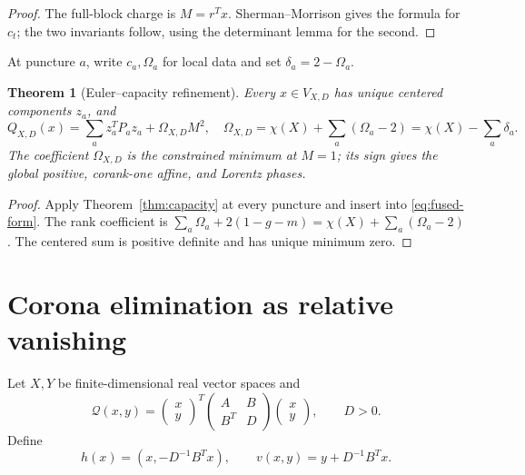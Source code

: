 \documentclass[11pt,a4paper]{amsart}
\theoremstyle{plain}
\newtheorem{theorem}{Theorem}[section]
\theoremstyle{definition}
\begin{document}
\begin{proof}
The full-block charge is $M=r^Tx$.  Sherman--Morrison gives the formula for $c_t$; the two
invariants follow, using the determinant lemma for the second.
\end{proof}

At puncture $a$, write $c_a,\Omega_a$ for local data and set $\delta_a=2-\Omega_a$.

\begin{theorem}[Euler--capacity refinement]\label{thm:euler-capacity}
Every $x\in V_{X,D}$ has unique centered components $z_a$, and
\begin{equation}\label{eq:euler-capacity}
 \boxed{Q_{X,D}(x)=\sum_a z_a^TP_az_a+\Omega_{X,D}M^2,
 \quad \Omega_{X,D}=\chi(X)+\sum_a(\Omega_a-2)
                    =\chi(X)-\sum_a\delta_a.}
\end{equation}
The coefficient $\Omega_{X,D}$ is the constrained minimum at $M=1$; its sign gives the global
positive, corank-one affine, and Lorentz phases.
\end{theorem}

\begin{proof}
Apply Theorem~\ref{thm:capacity} at every puncture and insert into \eqref{eq:fused-form}.  The rank
coefficient is
$\sum_a\Omega_a+2(1-g-m)=\chi(X)+\sum_a(\Omega_a-2)$.
The centered sum is positive definite and has unique minimum zero.
\end{proof}

\section{Corona elimination as relative vanishing}\label{sec:corona}

Let $X,Y$ be finite-dimensional real vector spaces and
\[
 \mathcal Q(x,y)=
 \begin{pmatrix}x\\y\end{pmatrix}^{T}
 \begin{pmatrix}A&B\\B^T&D\end{pmatrix}
 \begin{pmatrix}x\\y\end{pmatrix},\qquad D>0.
\]
Define
\begin{equation}\label{eq:corona-maps}
 h(x)=(x,-D^{-1}B^Tx),\qquad v(x,y)=y+D^{-1}B^Tx.
\end{equation}
\end{document}
